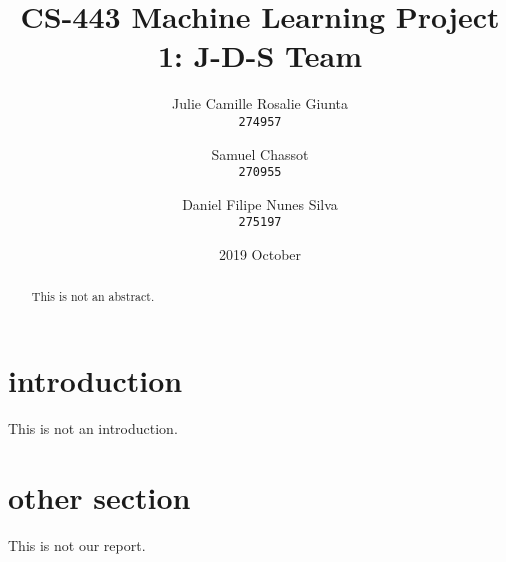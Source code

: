 \documentclass[11pt, a4paper, twoside]{article}
\begin{document}
\date{2019 October}
\title{CS-443 Machine Learning Project 1: J-D-S Team}
\author{
  Julie Camille Rosalie Giunta\\
  \texttt{274957}
  \and
  Samuel Chassot\\
  \texttt{270955}
  \and
  Daniel Filipe Nunes Silva\\
  \texttt{275197}
}

\maketitle
\clearpage

\begin{abstract}
This is not an abstract.
\end{abstract}

\section{introduction}
This is not an introduction.
 
\section{other section}
This is not our report.
\end{document}
